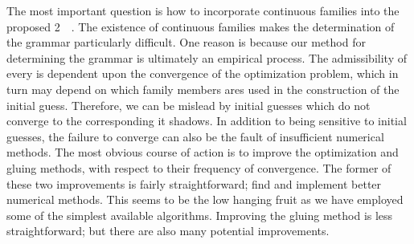 The most important question is how to incorporate
continuous families into the proposed  2\dmn\ \spt\ {\symbolic}.
The existence of continuous families makes the determination of the {\symbolic} grammar
particularly difficult. One reason is because our method for
determining the grammar is ultimately an empirical process.
The admissibility of every {\po} is
dependent upon the convergence of the optimization problem, which in turn may depend on
which {\fpo} family members ares used in the construction of the initial guess.
Therefore, we can be mislead by initial guesses which do not converge to the corresponding
{\po} it shadows. In addition to being sensitive to initial guesses, the
failure to converge can also be the fault of insufficient numerical methods.
The most obvious course of action is to improve the
optimization and gluing methods, with respect to their frequency of convergence.
The former of these two improvements is fairly
straightforward; find and implement better numerical methods. This seems
to be the low hanging fruit as we have employed some of the simplest available
algorithms. Improving the gluing method is less straightforward; but there are
also many potential improvements.

